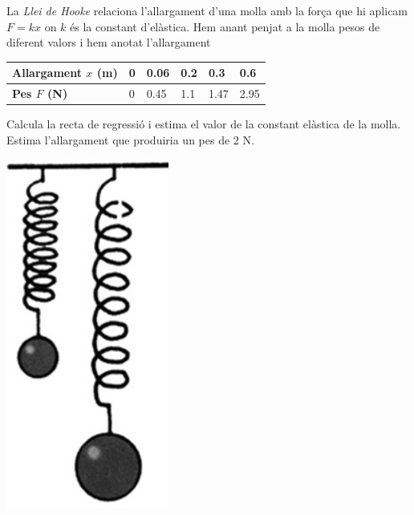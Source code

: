 \begin{mylist}
	
	\vspace{-1.5cm}
	\exer[1] \begin{minipage}[t]{0.7\textwidth}
		La \textit{Llei de Hooke} relaciona l'allargament d'una molla amb la força que hi aplicam $F=k x$ on $k$ és la constant d'elàstica. Hem anant penjat a la molla pesos de diferent valors i hem anotat l'allargament
		
		\begin{tabular}{|p{1.5in}|p{0.4in}|p{0.4in}|p{0.4in}|p{0.4in}|p{0.4in}|} \hline 
			\textbf{Allargament $x$ (m)} & 0 & 0.06 & 0.2 & 0.3 & 0.6  \\ \hline 
			\textbf{Pes $F$ (N)} & 0 & 0.45 & 1.1 & 1.47 & 2.95  \\ \hline 
		\end{tabular}
		\vspace{0.25cm}
		\begin{tasks}
			\task Calcula la recta de regressió i estima el valor de la constant elàstica de la molla.
			\task  Estima l'allargament que produiria un pes de 2 N. 
		\end{tasks}
		
	\end{minipage}
	\begin{minipage}{0.16\textwidth}
		\centering
		\vspace{2.25cm}
		\includegraphics[width=0.4\textwidth]{img-11/hooke}
	\end{minipage}


\end{mylist}
